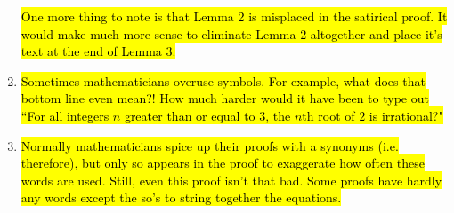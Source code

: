 \documentclass{article}
\begin{document}
\begin{enumerate}
		\hl{One more thing to note is that Lemma 2 is misplaced in the satirical proof. It would make much more sense to eliminate Lemma 2 altogether and place it's text at the end of Lemma 3.}
		\item {}\hl{Sometimes mathematicians overuse symbols. For example, what does that bottom line even mean?! How much harder would it have been to type out ``For all integers $n$ greater than or equal to $3$, the $n$th root of $2$ is irrational?"}
		\item {}\hl{Normally mathematicians spice up their proofs with a synonyms (i.e. therefore), but only so appears in the proof to exaggerate how often these words are used. Still, even this proof isn't that bad. Some proofs have hardly any words except the so's to string together the equations.}
	\end{enumerate}
\end{document}
